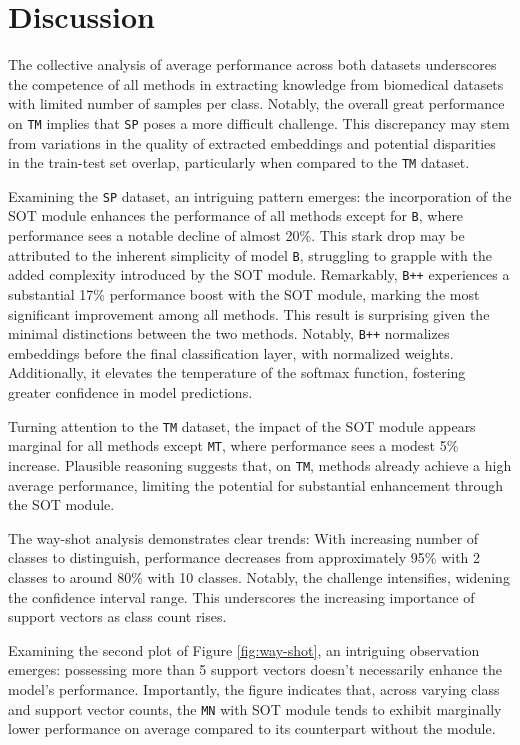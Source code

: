 \section{Discussion}

The collective analysis of average performance across both datasets underscores the competence 
of all methods in extracting knowledge from biomedical datasets with limited number of samples per class. 
Notably, the overall great performance on \texttt{TM} implies that \texttt{SP} poses a more difficult challenge. 
This discrepancy may stem from variations in the quality of extracted embeddings and potential disparities in the train-test set overlap, 
particularly when compared to the \texttt{TM} dataset.

Examining the \texttt{SP} dataset, an intriguing pattern emerges: the incorporation of the SOT module 
enhances the performance of all methods except for \texttt{B}, where performance sees a notable decline of almost 20\%. 
This stark drop may be attributed to the inherent simplicity of model \texttt{B}, struggling to grapple with the added complexity introduced by the SOT module. 
Remarkably, \texttt{B++} experiences a substantial 17\% performance boost with the SOT module, marking the most significant improvement among all methods. 
This result is surprising given the minimal distinctions between the two methods. 
Notably, \texttt{B++} normalizes embeddings before the final classification layer, with normalized weights. 
Additionally, it elevates the temperature of the softmax function, fostering greater confidence in model predictions.

Turning attention to the \texttt{TM} dataset, the impact of the SOT module appears marginal for all methods except \texttt{MT}, 
where performance sees a modest 5\% increase. Plausible reasoning suggests that, on \texttt{TM}, 
methods already achieve a high average performance, limiting the potential for substantial enhancement through the SOT module.

The way-shot analysis demonstrates clear trends: With increasing number of classes to distinguish, performance decreases from approximately 95\% with 2 classes to around 80\% with 10 classes. Notably, the challenge intensifies, widening the confidence interval range. This underscores the increasing importance of support vectors as class count rises.

Examining the second plot of Figure \ref{fig:way-shot}, an intriguing observation emerges:  possessing more than 5 support vectors doesn't necessarily enhance the model's performance.  Importantly, the figure indicates that, across varying class and support vector counts, the \texttt{MN} with SOT module tends to exhibit marginally lower performance on average compared  to its counterpart without the module. 